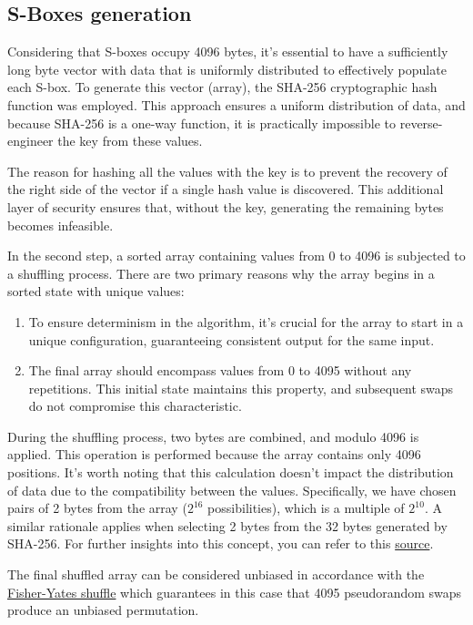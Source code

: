 \documentclass{article} %
\begin{document}
\subsection{S-Boxes generation}

Considering that S-boxes occupy 4096 bytes, it's essential to have a sufficiently long byte vector with data that is uniformly distributed to effectively populate each S-box. To generate this vector (array), the SHA-256 cryptographic hash function was employed. This approach ensures a uniform distribution of data, and because SHA-256 is a one-way function, it is practically impossible to reverse-engineer the key from these values.

The reason for hashing all the values with the key is to prevent the recovery of the right side of the vector if a single hash value is discovered. This additional layer of security ensures that, without the key, generating the remaining bytes becomes infeasible.

In the second step, a sorted array containing values from 0 to 4096 is subjected to a shuffling process. There are two primary reasons why the array begins in a sorted state with unique values:

\begin{enumerate}
\item To ensure determinism in the algorithm, it's crucial for the array to start in a unique configuration, guaranteeing consistent output for the same input.
\item The final array should encompass values from 0 to 4095 without any repetitions. This initial state maintains this property, and subsequent swaps do not compromise this characteristic.
\end{enumerate}

During the shuffling process, two bytes are combined, and modulo 4096 is applied. This operation is performed because the array contains only 4096 positions. It's worth noting that this calculation doesn't impact the distribution of data due to the compatibility between the values. Specifically, we have chosen pairs of 2 bytes from the array ($2^{16}$ possibilities), which is a multiple of $2^{10}$. A similar rationale applies when selecting 2 bytes from the 32 bytes generated by SHA-256. For further insights into this concept, you can refer to this \href{https://crypto.stackexchange.com/a/21010}{source}.

The final shuffled array can be considered unbiased in accordance with the \href{https://en.wikipedia.org/wiki/Fisher%E2%80%93Yates_shuffle}{Fisher-Yates shuffle} which guarantees in this case that 4095 pseudorandom swaps produce an unbiased permutation. 
\end{document}
